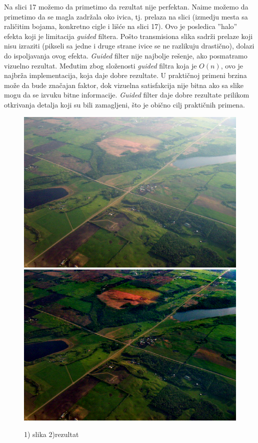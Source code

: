 \documentclass[a4paper,12pt,titlepage]{article}
\begin{document}
Na slici 17 možemo da primetimo da rezultat nije perfektan. Naime možemo da primetimo da se magla zadržala oko ivica, tj. prelaza na slici (izmedju mesta sa raličitim bojama, konkretno cigle i lišće na slici 17). Ovo je posledica ''halo'' efekta koji je limitacija \emph{guided} filtera. Pošto transmisiona slika sadrži prelaze koji nisu izraziti (pikseli sa jedne i druge strane ivice se ne razlikuju drastično), dolazi do ispoljavanja ovog efekta. \emph{Guided} filter nije najbolje rešenje, ako posmatramo vizuelno rezultat. Međutim zbog složenosti \emph{guided} filtra koja je $O(n)$, ovo je najbrža implementacija, koja daje dobre rezultate. U praktičnoj primeni brzina može da bude značajan faktor, dok vizuelna satisfakcija nije bitna ako sa slike mogu da se izvuku bitne informacije. \emph{Guided} filter daje dobre rezultate prilikom otkrivanja detalja koji su bili zamagljeni, što je obično cilj praktičnih primena.

\begin{figure}[ht!]
\centering
\includegraphics[width=120mm]{img/aerial.png}
\includegraphics[width=120mm]{img/aerialDe.png}
\caption{1) slika 2)rezultat}
\label{overflow}
\end{figure}   
\end{document}
